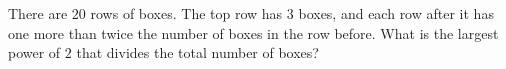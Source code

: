 There are $20$ rows of boxes. The top row has $3$ boxes, and each row after it has one more than twice the number of boxes in the row before. What is the largest power of $2$ that divides the total number of boxes?
